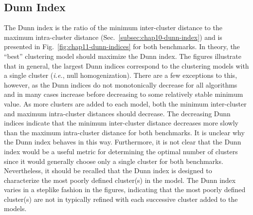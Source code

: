 \clearpage

\subsection{Dunn Index}
\label{subsec:chap11-dunn-index}

The Dunn index is the ratio of the minimum inter-cluster distance to the maximum intra-cluster distance (Sec.~\ref{subsec:chap10-dunn-index}) and is presented in Fig.~\ref{fig:chap11-dunn-indices} for both benchmarks. In theory, the ``best'' clustering model should maximize the Dunn index. The figures illustrate that in general, the largest Dunn indices correspond to the clustering models with a single cluster (\textit{i.e.}, null homogenization). There are a few exceptions to this, however, as the Dunn indices do not monotonically decrease for all algorithms and in many cases increase before decreasing to some relatively stable minimum value. As more clusters are added to each model, both the minimum inter-cluster and maximum intra-cluster distances should decrease. The decreasing Dunn indices indicate that the minimum inter-cluster distance decreases more slowly than the maximum intra-cluster distance for both benchmarks. It is unclear why the Dunn index behaves in this way. Furthermore, it is not clear that the Dunn index would be a useful metric for determining the optimal number of clusters since it would generally choose only a single cluster for both benchmarks. Nevertheless, it should be recalled that the Dunn index is designed to characterize the most poorly defined cluster(s) in the model. The Dunn index varies in a steplike fashion in the figures, indicating that the most poorly defined cluster(s) are not in typically refined with each successive cluster added to the models.

